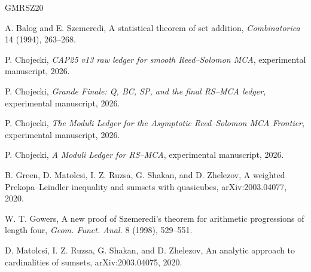 \documentclass[11pt,a4paper]{amsart}
\numberwithin{equation}{section}
\theoremstyle{remark}
\begin{document}
\begin{thebibliography}{GMRSZ20}

A. Balog and E. Szemeredi,
\newblock A statistical theorem of set addition,
\newblock \emph{Combinatorica} 14 (1994), 263--268.

P. Chojecki,
\newblock \emph{CAP25 v13 raw ledger for smooth Reed--Solomon MCA},
\newblock experimental manuscript, 2026.

P. Chojecki,
\newblock \emph{Grande Finale: Q, BC, SP, and the final RS--MCA ledger},
\newblock experimental manuscript, 2026.

P. Chojecki,
\newblock \emph{The Moduli Ledger for the Asymptotic Reed--Solomon MCA Frontier},
\newblock experimental manuscript, 2026.

P. Chojecki,
\newblock \emph{A Moduli Ledger for RS--MCA},
\newblock experimental manuscript, 2026.

B. Green, D. Matolcsi, I. Z. Ruzsa, G. Shakan, and D. Zhelezov,
\newblock A weighted Prekopa--Leindler inequality and sumsets with quasicubes,
\newblock arXiv:2003.04077, 2020.

W. T. Gowers,
\newblock A new proof of Szemeredi's theorem for arithmetic progressions of length four,
\newblock \emph{Geom. Funct. Anal.} 8 (1998), 529--551.

D. Matolcsi, I. Z. Ruzsa, G. Shakan, and D. Zhelezov,
\newblock An analytic approach to cardinalities of sumsets,
\newblock arXiv:2003.04075, 2020.

\end{thebibliography}
\end{document}
